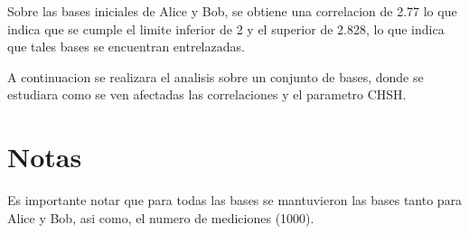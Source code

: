\documentclass[11pt]{article}
\begin{document}
Sobre las bases iniciales de Alice y Bob, se obtiene una correlacion de 2.77 lo que indica que se cumple el limite inferior de 2 y el superior de 2.828, lo que indica que tales bases se encuentran entrelazadas.

A continuacion se realizara el analisis sobre un conjunto de bases, donde se estudiara como se ven afectadas las correlaciones y el parametro CHSH.

\section{Notas}

Es importante notar que para todas las bases se mantuvieron las bases tanto para Alice y Bob, asi como, el numero de mediciones (1000).
\end{document}

